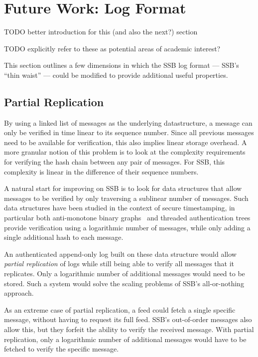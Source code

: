 \documentclass[sigconf]{acmart}
\begin{document}

\section{Future Work: Log Format}

TODO better introduction for this (and also the next?) section

TODO explicitly refer to these as potential areas of academic interest?

This section outlines a few dimensions in which the SSB log format --- SSB's ``thin waist'' --- could be modified to provide additional useful properties.

\subsection{Partial Replication}

By using a linked list of messages as the underlying datastructure, a message can only be verified in time linear to its sequence number. Since all previous messages need to be available for verification, this also implies linear storage overhead. A more granular notion of this problem is to look at the complexity requirements for verifying the hash chain between any pair of messages. For SSB, this complexity is linear in the difference of their sequence numbers.

A natural start for improving on SSB is to look for data structures that allow messages to be verified by only traversing a sublinear number of messages. Such data structures have been studied in the context of secure timestamping, in particular both anti-monotone binary graphs~\cite{buldas1998new} and threaded authentication trees~\cite{buldas2000optimally} provide verification using a logarithmic number of messages, while only adding a single additional hash to each message.

An authenticated append-only log built on these data structure would allow {\em partial replication} of logs while still being able to verify all messages that it replicates. Only a logarithmic number of additional messages would need to be stored. Such a system would solve the scaling problems of SSB's all-or-nothing approach.

As an extreme case of partial replication, a feed could fetch a single specific message, without having to request its full feed. SSB's out-of-order messages also allow this, but they forfeit the ability to verify the received message. With partial replication, only a logarithmic number of additional messages would have to be fetched to verify the specific message.
\end{document}
